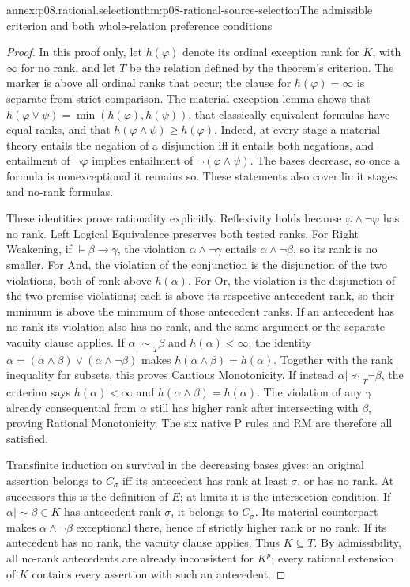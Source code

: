 \begin{annexitem}{annex:p08.rational.selection}{thm:p08-rational-source-selection}{The admissible criterion and both whole-relation preference conditions}
\begin{proof}
In this proof only, let \(h(\varphi)\) denote its ordinal exception
rank for \(K\), with \(\infty\) for no rank, and let \(T\)
be the relation defined by the theorem's criterion. The marker is above
all ordinal ranks that occur; the clause for \(h(\varphi)=\infty\)
is separate from strict comparison. The material exception lemma shows
that \(h(\varphi\vee\psi)=\min(h(\varphi),h(\psi))\),
that classically equivalent formulas have equal ranks, and that
\(h(\varphi\wedge\psi)\geq h(\varphi)\).
Indeed, at every stage a material theory entails the negation of a
disjunction iff it entails both negations, and entailment of
\(\neg\varphi\) implies entailment of
\(\neg(\varphi\wedge\psi)\). The bases decrease, so once a
formula is nonexceptional it remains so. These statements also cover
limit stages and no-rank formulas.

These identities prove rationality explicitly. Reflexivity holds because
\(\varphi\wedge\neg\varphi\) has no rank. Left Logical
Equivalence preserves both tested ranks. For Right Weakening, if
\(\models\beta\to\gamma\), the violation
\(\alpha\wedge\neg\gamma\) entails
\(\alpha\wedge\neg\beta\), so its rank is no smaller.
For And, the violation of the conjunction is the disjunction of the
two violations, both of rank above \(h(\alpha)\).
For Or, the violation is the disjunction of the two premise violations;
each is above its respective antecedent rank, so their minimum is
above the minimum of those antecedent ranks. If an antecedent has no
rank its violation also has no rank, and the same argument or the
separate vacuity clause applies.
If \(\alpha\mathrel{|\!\sim}_T\beta\) and
\(h(\alpha)<\infty\), the identity
\(\alpha=(\alpha\wedge\beta)\vee(\alpha\wedge\neg\beta)\)
makes \(h(\alpha\wedge\beta)=h(\alpha)\).
Together with the rank inequality for subsets, this proves Cautious
Monotonicity. If instead
\(\alpha\mathrel{|\!\not\sim}_T\neg\beta\),
the criterion says \(h(\alpha)<\infty\) and
\(h(\alpha\wedge\beta)=h(\alpha)\). The violation of any
\(\gamma\) already consequential from \(\alpha\) still has
higher rank after intersecting with \(\beta\), proving Rational
Monotonicity. The six native P rules and RM are therefore all satisfied.

Transfinite induction on survival in the decreasing bases gives:
an original assertion belongs to \(C_\sigma\) iff its antecedent
has rank at least \(\sigma\), or has no rank. At successors this
is the definition of \(E\); at limits it is the intersection
condition. If \(\alpha\mathrel{|\!\sim}\beta\in K\)
has antecedent rank \(\sigma\), it belongs to \(C_\sigma\).
Its material counterpart makes \(\alpha\wedge\neg\beta\)
exceptional there, hence of strictly higher rank or no rank. If its
antecedent has no rank, the vacuity clause applies. Thus \(K\subseteq T\).
By admissibility, all no-rank antecedents are already inconsistent
for \(K^p\); every rational extension of \(K\) contains every
assertion with such an antecedent.


\end{proof}
\end{annexitem}
